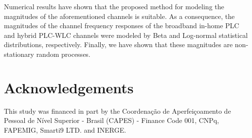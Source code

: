 \documentclass[journal]{IEEEtran}
\begin{document}
Numerical results have shown that the proposed method for modeling the magnitudes of the aforementioned channels is suitable. As a consequence, the magnitudes of the channel frequency responses of the broadband in-home \ac{PLC} and hybrid \ac{PLC}-\ac{WLC} channels were modeled by Beta and Log-normal statistical distributions, respectively. Finally, we have shown that these magnitudes are non-stationary random processes. 
 
\section*{Acknowledgements}
This study was financed in part by the Coordena\c{c}\~ao de Aperfei\c{c}oamento de Pessoal de N\'ivel Superior - Brasil (CAPES) - Finance Code 001, CNPq, FAPEMIG, Smarti9 LTD. and INERGE.



\end{document}
